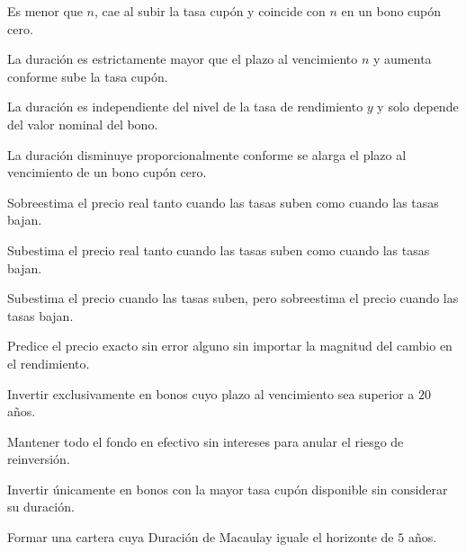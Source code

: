 \begin{opts}
    \item Es menor que $n$, cae al subir la tasa cupón y coincide con $n$ en un bono cupón cero.
    \item La duración es estrictamente mayor que el plazo al vencimiento $n$ y aumenta conforme sube la tasa cupón.
    \item La duración es independiente del nivel de la tasa de rendimiento $y$ y solo depende del valor nominal del bono.
    \item La duración disminuye proporcionalmente conforme se alarga el plazo al vencimiento de un bono cupón cero.
\end{opts}

\begin{opts}
    \item Sobreestima el precio real tanto cuando las tasas suben como cuando las tasas bajan.
    \item Subestima el precio real tanto cuando las tasas suben como cuando las tasas bajan.
    \item Subestima el precio cuando las tasas suben, pero sobreestima el precio cuando las tasas bajan.
    \item Predice el precio exacto sin error alguno sin importar la magnitud del cambio en el rendimiento.
\end{opts}

\begin{opts}
    \item Invertir exclusivamente en bonos cuyo plazo al vencimiento sea superior a $20$ años.
    \item Mantener todo el fondo en efectivo sin intereses para anular el riesgo de reinversión.
    \item Invertir únicamente en bonos con la mayor tasa cupón disponible sin considerar su duración.
    \item Formar una cartera cuya Duración de Macaulay iguale el horizonte de $5$ años.
\end{opts}

